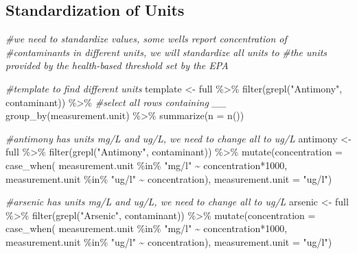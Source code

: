 \documentclass[12pt, twoside]{amherstthesis}
\newenvironment{Shaded}{\begin{snugshade}}{\end{snugshade}}
\newcommand{\AttributeTok}[1]{\textcolor[rgb]{0.77,0.63,0.00}{#1}}
\newcommand{\CommentTok}[1]{\textcolor[rgb]{0.56,0.35,0.01}{\textit{#1}}}
\newcommand{\DecValTok}[1]{\textcolor[rgb]{0.00,0.00,0.81}{#1}}
\newcommand{\FunctionTok}[1]{\textcolor[rgb]{0.00,0.00,0.00}{#1}}
\newcommand{\NormalTok}[1]{#1}
\newcommand{\OtherTok}[1]{\textcolor[rgb]{0.56,0.35,0.01}{#1}}
\newcommand{\SpecialCharTok}[1]{\textcolor[rgb]{0.00,0.00,0.00}{#1}}
\newcommand{\StringTok}[1]{\textcolor[rgb]{0.31,0.60,0.02}{#1}}
\begin{document}
\hypertarget{standardization-of-units}{%
\subsection{Standardization of Units}\label{standardization-of-units}}
\begin{Shaded}
\begin{Highlighting}[]
\CommentTok{\#we need to standardize values, some wells report concentration of}
\CommentTok{\#contaminants in different units, we will standardize all units to }
\CommentTok{\#the units provided by the health{-}based threshold set by the EPA}

\CommentTok{\#template to find different units}
\NormalTok{template }\OtherTok{\textless{}{-}}\NormalTok{ full }\SpecialCharTok{\%\textgreater{}\%}
  \FunctionTok{filter}\NormalTok{(}\FunctionTok{grepl}\NormalTok{(}\StringTok{"Antimony"}\NormalTok{, contaminant)) }\SpecialCharTok{\%\textgreater{}\%} \CommentTok{\#select all rows containing \_\_}
  \FunctionTok{group\_by}\NormalTok{(measurement.unit) }\SpecialCharTok{\%\textgreater{}\%}
  \FunctionTok{summarize}\NormalTok{(}\AttributeTok{n =} \FunctionTok{n}\NormalTok{())}

\CommentTok{\#antimony has units mg/L and ug/L, we need to change all to ug/L}
\NormalTok{antimony }\OtherTok{\textless{}{-}}\NormalTok{ full }\SpecialCharTok{\%\textgreater{}\%}
  \FunctionTok{filter}\NormalTok{(}\FunctionTok{grepl}\NormalTok{(}\StringTok{"Antimony"}\NormalTok{, contaminant)) }\SpecialCharTok{\%\textgreater{}\%}
  \FunctionTok{mutate}\NormalTok{(}\AttributeTok{concentration =} 
           \FunctionTok{case\_when}\NormalTok{(}
\NormalTok{             measurement.unit }\SpecialCharTok{\%in\%} \StringTok{"mg/l"} \SpecialCharTok{\textasciitilde{}}\NormalTok{ concentration}\SpecialCharTok{*}\DecValTok{1000}\NormalTok{,}
\NormalTok{             measurement.unit }\SpecialCharTok{\%in\%} \StringTok{"ug/l"} \SpecialCharTok{\textasciitilde{}}\NormalTok{ concentration),}
         \AttributeTok{measurement.unit =} \StringTok{"ug/l"}\NormalTok{)}
  
\CommentTok{\#arsenic has units mg/L and ug/L, we need to change all to ug/L}
\NormalTok{arsenic }\OtherTok{\textless{}{-}}\NormalTok{ full }\SpecialCharTok{\%\textgreater{}\%}
  \FunctionTok{filter}\NormalTok{(}\FunctionTok{grepl}\NormalTok{(}\StringTok{"Arsenic"}\NormalTok{, contaminant)) }\SpecialCharTok{\%\textgreater{}\%}
  \FunctionTok{mutate}\NormalTok{(}\AttributeTok{concentration =} 
           \FunctionTok{case\_when}\NormalTok{(}
\NormalTok{             measurement.unit }\SpecialCharTok{\%in\%} \StringTok{"mg/l"} \SpecialCharTok{\textasciitilde{}}\NormalTok{ concentration}\SpecialCharTok{*}\DecValTok{1000}\NormalTok{,}
\NormalTok{             measurement.unit }\SpecialCharTok{\%in\%} \StringTok{"ug/l"} \SpecialCharTok{\textasciitilde{}}\NormalTok{ concentration),}
         \AttributeTok{measurement.unit =} \StringTok{"ug/l"}\NormalTok{)}


\end{Highlighting}
\end{Shaded}
\end{document}
